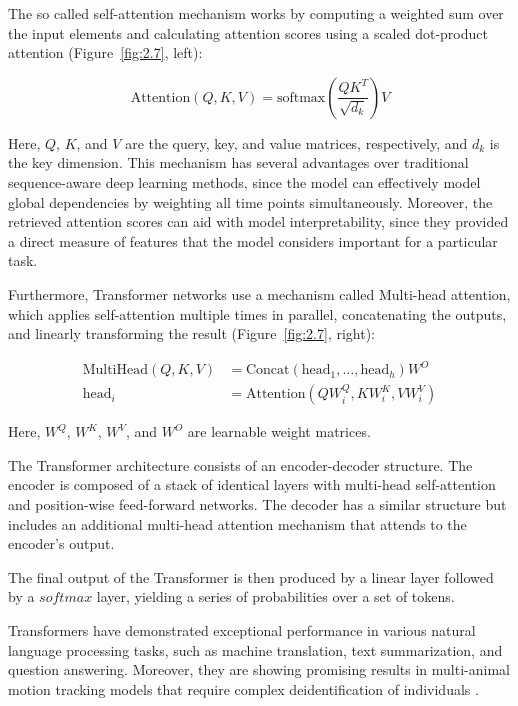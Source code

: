 The so called self-attention mechanism works by computing a weighted sum over the input elements and calculating attention scores using a scaled dot-product attention (Figure~\ref{fig:2.7}, left):

\begin{equation}
\text{Attention}(Q, K, V) = \text{softmax}\left(\frac{QK^T}{\sqrt{d_k}}\right)V
\end{equation}

Here, $Q$, $K$, and $V$ are the query, key, and value matrices, respectively, and $d_k$ is the key dimension. This mechanism has several advantages over traditional sequence-aware deep learning methods, since the model can effectively model global dependencies by weighting all time points simultaneously. Moreover, the retrieved attention scores can aid with model interpretability, since they provided a direct measure of features that the model considers important for a particular task.

Furthermore, Transformer networks use a mechanism called Multi-head attention, which applies self-attention multiple times in parallel, concatenating the outputs, and linearly transforming the result (Figure~\ref{fig:2.7}, right):

\begin{align}
\text{MultiHead}(Q, K, V) &= \text{Concat}(\text{head}_1, \dots, \text{head}_h)W^O \\
\text{head}_i &= \text{Attention}(QW_i^Q, KW_i^K, VW_i^V)
\end{align}

\noindent Here, $W^Q$, $W^K$, $W^V$, and $W^O$ are learnable weight matrices.

The Transformer architecture consists of an encoder-decoder structure. The encoder is composed of a stack of identical layers with multi-head self-attention and position-wise feed-forward networks. The decoder has a similar structure but includes an additional multi-head attention mechanism that attends to the encoder's output.

The final output of the Transformer is then produced by a linear layer followed by a $softmax$ layer, yielding a series of probabilities over a set of tokens. 

Transformers have demonstrated exceptional performance in various natural language processing tasks, such as machine translation, text summarization, and question answering. Moreover, they are showing promising results in multi-animal motion tracking models that require complex deidentification of individuals \cite{Lauer2022Multi-animalDeepLabCut}. 

